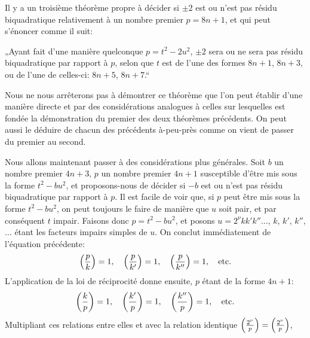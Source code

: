 \par\indent
Il y a un troisième théorème propre à décider si $\pm2$ est ou n'est pas
résidu biquadratique relativement à un nombre premier $p=8n+1$, et qui peut
s'énoncer comme il suit:
\par\indent
„Ayant fait d'une manière quelconque $p=t^2-2u^2$, $\pm2$ sera ou ne sera
pas résidu biquadratique par rapport à $p$, selon que $t$ est de l'une des formes
$8n+1$, $8n+3$, ou de l'une de celles-ci: $8n+5$, $8n+7$.“
\par\indent
Nous ne nous arrêterons pas à démontrer ce théorème que l'on peut
établir d'une manière directe et par des considérations analogues à celles sur
lesquelles est fondée la démonstration du premier des deux théorèmes précédents.
On peut aussi le déduire de chacun des précédents à-peu-près comme on vient
de passer du premier au second.
\par\indent
Nous allons maintenant passer à des considérations plus générales. Soit
$b$ un nombre premier $4n+3$, $p$ un nombre premier $4n+1$ susceptible d'être
mis sous la forme $t^2-bu^2$, et proposons-nous de décider si $-b$ est ou n'est
pas résidu biquadratique par rapport à $p$. Il est facile de voir que, si $p$ peut
être mis sous la forme $t^2-bu^2$, on peut toujours le faire de manière que $u$
soit pair, et par conséquent $t$ impair.
Faisons donc $p=t^2-bu^2$, et posons
$u=2^\nu kk'k''\ldots$, $k$, $k'$, $k''$, $\ldots$ étant les facteurs impairs simples de $u$. On
conclut immédiatement de l'équation précédente:
\[
\left(\frac{p}{k}\right)=1,\quad \left(\frac{p}{k'}\right)=1,\quad \left(\frac{p}{k''}\right)=1,\quad\text{etc.}
\]
L'application de la loi de réciprocité donne ensuite, $p$ étant de la forme $4n+1$:
\[
\left(\frac{k}{p}\right)=1,\quad \left(\frac{k'}{p}\right)=1,\quad \left(\frac{k''}{p}\right)=1,\quad\text{etc.}
\]
Multipliant ces relations entre elles et avec la relation identique $\left(\frac{2^\nu}{p}\right)=\left(\frac{2^\nu}{p}\right)$,

